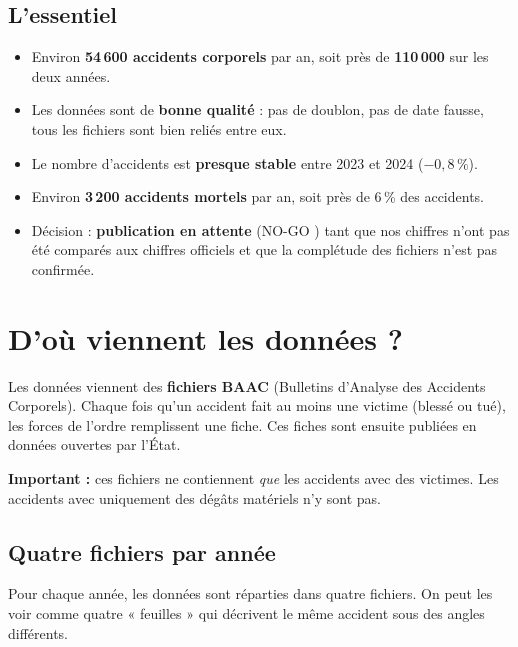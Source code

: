 \documentclass[11pt,a4paper]{article}
\begin{document}
\subsection*{L'essentiel}

\begin{itemize}
    \item Environ \textbf{54\,600 accidents corporels} par an, soit près de
          \textbf{110\,000} sur les deux années.
    \item Les données sont de \textbf{bonne qualité} : pas de doublon, pas de
          date fausse, tous les fichiers sont bien reliés entre eux.
    \item Le nombre d'accidents est \textbf{presque stable} entre 2023 et 2024
          ($-0{,}8\,\%$).
    \item Environ \textbf{3\,200 accidents mortels} par an, soit près de
          6\,\% des accidents.
    \item Décision : \textbf{publication en attente} (\og NO-GO \fg{}) tant que
          nos chiffres n'ont pas été comparés aux chiffres officiels et que la
          complétude des fichiers n'est pas confirmée.
\end{itemize}

\section{D'où viennent les données ?}

Les données viennent des \textbf{fichiers BAAC} (Bulletins d'Analyse des
Accidents Corporels). Chaque fois qu'un accident fait au moins une victime
(blessé ou tué), les forces de l'ordre remplissent une fiche. Ces fiches sont
ensuite publiées en données ouvertes par l'État.

\medskip
\noindent\textbf{Important :} ces fichiers ne contiennent \emph{que} les
accidents avec des victimes. Les accidents avec uniquement des dégâts matériels
n'y sont pas.

\subsection{Quatre fichiers par année}

Pour chaque année, les données sont réparties dans quatre fichiers. On peut les
voir comme quatre « feuilles » qui décrivent le même accident sous des angles
différents.
\end{document}
